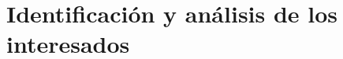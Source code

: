 \documentclass[11pt]{charter}
\begin{document}
%
%
%
%
%
%
%


\section{Identificación y análisis de los interesados}
\label{sec:interesados}
\end{document}
